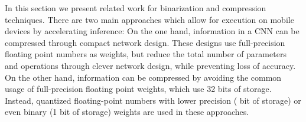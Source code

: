 \documentclass[10pt,twocolumn,letterpaper]{article}
\newcommand{\architecture}[1]{\emph{#1}}
\begin{document}
In this section we present related work for binarization and compression techniques.
There are two main approaches which allow for execution on mobile devices by accelerating inference:
On the one hand, information in a CNN can be compressed through compact network design.
These designs use full-precision floating point numbers as weights, but reduce the total number of parameters and operations through clever network design, while preventing loss of accuracy.
On the other hand, information can be compressed by avoiding the common usage of full-precision floating point weights, which use 32 bits of storage.
Instead, quantized floating-point numbers with lower precision ( bit of storage) or even binary (1 bit of storage) weights are used in these approaches.
\end{document}
